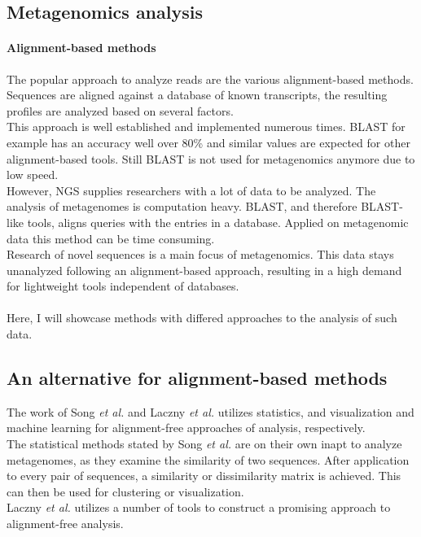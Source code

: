 \documentclass[twocolumn]{bmcart}%
\begin{document}
\subsection*{Metagenomics analysis}
\paragraph*{Alignment-based methods}
The popular approach to analyze reads are the various alignment-based methods.\\
Sequences are aligned against a database of known transcripts, the resulting profiles are analyzed based on several factors.\\
This approach is well established and implemented numerous times. BLAST for example has an accuracy well over 80\%\cite{doi:10.1142/9789814295291_0003}  and similar values are expected for other alignment-based tools. Still BLAST is not used for metagenomics anymore due to low speed.\\
However, NGS supplies researchers with a lot of data to be analyzed. The analysis of metagenomes is computation heavy. BLAST, and therefore BLAST-like tools, aligns queries with the entries in a database. Applied on metagenomic data this method can be time consuming.\\
Research of  novel sequences is a main focus of metagenomics. This data stays unanalyzed following an alignment-based approach, resulting in a high demand for lightweight tools independent of databases.
\paragraph*{}
Here, I will showcase methods with differed approaches to the analysis of such data. 
\subsection*{An alternative for alignment-based methods}
The work of Song \textit{et al.} \cite{doi:10.1093/bib/bbt067} and Laczny \textit{et al.} \cite{Laczny2014} utilizes statistics, and visualization and machine learning for alignment-free approaches of analysis, respectively.\\
The statistical methods stated by Song \textit{et al.} are on their own inapt to analyze metagenomes, as they examine the similarity of two sequences. After application to every pair of sequences, a similarity or dissimilarity matrix is achieved. This can then be used for clustering or visualization.\\
Laczny \textit{et al.} utilizes a number of tools to construct a promising approach to alignment-free analysis.
\end{document}
